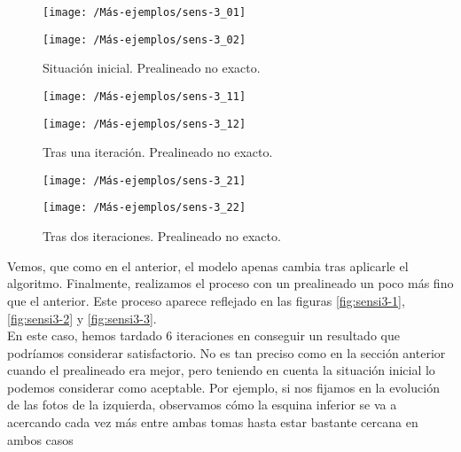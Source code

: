 \begin{figure}[h!]	
	\begin{minipage}[b]{0.5\textwidth}
		\centering		
		\texttt{[image: /Más-ejemplos/sens-3\_01]} 
	\end{minipage}
	\begin{minipage}[b]{0.5\textwidth}
		\centering
		\texttt{[image: /Más-ejemplos/sens-3\_02]}
	\end{minipage}	
	\caption{Situación inicial. Prealineado no exacto.}
	\label{fig:sensi-2-1}
\end{figure}
\begin{figure}[h!]	
	\begin{minipage}[b]{0.5\textwidth}
		\centering		
		\texttt{[image: /Más-ejemplos/sens-3\_11]} 
	\end{minipage}
	\begin{minipage}[b]{0.5\textwidth}
		\centering
		\texttt{[image: /Más-ejemplos/sens-3\_12]}
	\end{minipage}	
	\caption{Tras una iteración. Prealineado no exacto.}
	\label{fig:sensi-2-2}
\end{figure}

\begin{figure}[h!]	
	\begin{minipage}[b]{0.5\textwidth}
		\centering		
		\texttt{[image: /Más-ejemplos/sens-3\_21]} 
	\end{minipage}
	\begin{minipage}[b]{0.5\textwidth}
		\texttt{[image: /Más-ejemplos/sens-3\_22]}
	\end{minipage}	
	\caption{Tras dos iteraciones. Prealineado no exacto.}
	\label{fig:sensi-2-3}
\end{figure}

Vemos, que como en el anterior, el modelo apenas cambia tras aplicarle el algoritmo. Finalmente, realizamos el proceso con un prealineado un poco más fino que el anterior. Este proceso aparece reflejado en las figuras \ref{fig:sensi3-1}, \ref{fig:sensi3-2} y \ref{fig:sensi3-3}.\\

En este caso, hemos tardado 6 iteraciones en conseguir un resultado que podríamos considerar satisfactorio. No es tan preciso como en la sección anterior cuando el prealineado era mejor, pero teniendo en cuenta la situación inicial lo podemos considerar como aceptable. Por ejemplo, si nos fijamos en la evolución de las fotos de la izquierda, observamos cómo la esquina inferior se va a acercando cada vez más entre ambas tomas hasta estar bastante cercana en ambos casos

